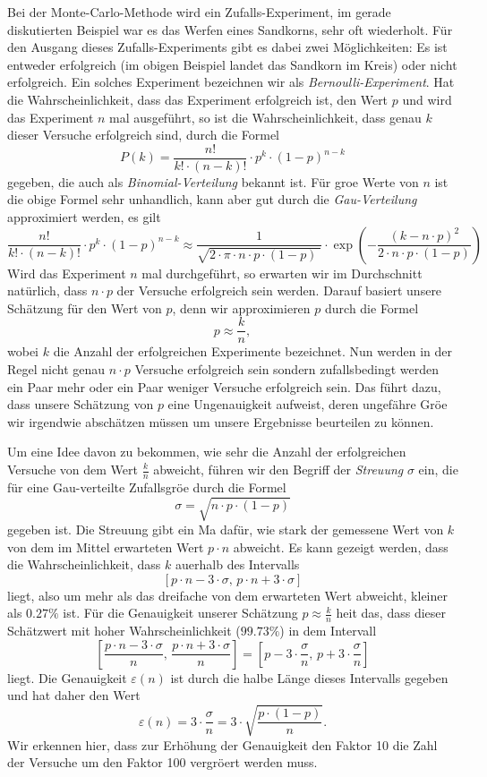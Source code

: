 Bei der Monte-Carlo-Methode wird ein Zufalls-Experiment, im gerade diskutierten Beispiel war es das Werfen
eines Sandkorns, sehr oft wiederholt.  F\"ur den Ausgang dieses Zufalls-Experiments gibt es dabei zwei
M\"oglichkeiten:  Es ist entweder erfolgreich (im obigen Beispiel landet das Sandkorn im Kreis) oder nicht
erfolgreich.  Ein solches Experiment bezeichnen wir als \emph{Bernoulli-Experiment}.
 Hat die Wahrscheinlichkeit, dass das Experiment erfolgreich ist, den Wert $p$ und wird das
Experiment $n$ mal ausgef\"uhrt, so ist die Wahrscheinlichkeit, dass genau $k$ dieser Versuche erfolgreich sind,
durch die Formel
\[ P(k) = \frac{n!}{k! \cdot (n-k)!} \cdot p^k \cdot (1-p)^{n-k} \]
gegeben, die auch als \emph{Binomial-Verteilung} bekannt ist.  F\"ur gro\3e Werte von $n$ ist die obige Formel
sehr unhandlich, kann aber gut durch die \emph{Gau\3-Verteilung} approximiert werden, es gilt
\[ \frac{n!}{k! \cdot (n-k)!} \cdot p^k \cdot (1-p)^{n-k} \approx  
   \frac{1}{\sqrt{2\cdot \pi \cdot n \cdot p \cdot (1-p)\;}} \cdot 
   \exp\left(-\frac{(k - n \cdot p)^2}{2 \cdot n \cdot p \cdot (1 - p)}\right)
\]
Wird das Experiment $n$ mal durchgef\"uhrt, so erwarten wir im Durchschnitt nat\"urlich, dass $n \cdot p$ der
Versuche erfolgreich sein werden.  Darauf basiert unsere Sch\"atzung f\"ur den Wert von $p$, denn wir approximieren
$p$ durch die Formel
\[ p \approx \frac{k}{n}, \]
wobei $k$ die Anzahl der erfolgreichen Experimente bezeichnet.  Nun werden in der Regel nicht genau $n \cdot p$
Versuche erfolgreich sein sondern zufallsbedingt werden ein Paar mehr oder ein Paar weniger Versuche
erfolgreich sein.  Das f\"uhrt dazu, dass unsere Sch\"atzung von $p$ eine Ungenauigkeit aufweist, deren ungef\"ahre
Gr\"o\3e wir irgendwie absch\"atzen m\"ussen um unsere Ergebnisse beurteilen zu k\"onnen.

Um eine Idee davon zu bekommen, wie sehr die Anzahl der erfolgreichen Versuche von dem Wert $\frac{k}{n}$
abweicht,  f\"uhren wir den Begriff der \emph{Streuung} $\sigma$ ein, die f\"ur eine Gau\3-verteilte Zufallsgr\"o\3e
durch die Formel
\[ \sigma = \sqrt{n \cdot p \cdot (1 - p)} \]
gegeben ist.  Die Streuung gibt ein Ma\3 daf\"ur, wie stark der gemessene Wert von $k$ von dem im Mittel
erwarteten Wert $p \cdot n$ abweicht.  Es kann gezeigt werden, dass die Wahrscheinlichkeit, dass $k$ au\3erhalb
des Intervalls
\[ [ p \cdot n - 3 \cdot \sigma,\, p \cdot n + 3 \cdot \sigma ] \]
liegt, also um mehr als das dreifache von dem erwarteten Wert abweicht, kleiner als $0.27 \%$ ist.  F\"ur
 die Genauigkeit unserer Sch\"atzung $p \approx \frac{k}{n}$ hei\3t das, dass dieser Sch\"atzwert mit hoher
 Wahrscheinlichkeit ($99.73\%$) in dem Intervall
\[  \left[ \frac{p \cdot n - 3 \cdot \sigma}{n},\, \frac{p \cdot n + 3 \cdot \sigma}{n} \right] 
  = \left[ p - 3 \cdot \frac{\sigma}{n},\, p + 3 \cdot \frac{\sigma}{n} \right]
\] 
liegt.  Die Genauigkeit $\varepsilon(n)$ ist durch die halbe L\"ange dieses Intervalls gegeben und hat daher den
Wert 
\[ \varepsilon(n) = 3 \cdot \frac{\sigma}{n} = 3 \cdot \sqrt{\frac{p \cdot (1 - p)}{n}}. \]
Wir erkennen hier, dass zur Erh\"ohung der Genauigkeit den Faktor 10 die Zahl der Versuche um den Faktor 100
vergr\"o\3ert werden muss.

